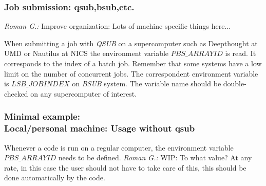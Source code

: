 \documentclass{emulateapj}
\newcommand{\rg}[1]{\color{blue}\textit{Roman G.:} #1\color{black}}
\begin{document}
\subsubsection{Job submission: qsub,bsub,etc.}
\rg{Improve organization: Lots of machine specific things here...}

When submitting a job with \textit{QSUB} on a supercomputer such as
Deepthought at UMD or Nautilus at NICS the environment variable
$PBS\_ARRAYID$ is read. It corresponds to the index of a batch job.
Remember that some systems have a low limit on the number of
concurrent jobs.  The correspondent environment variable is
$LSB\_JOBINDEX$ on \textit{BSUB} system. The variable name should be
double-checked on any supercomputer of interest.  

\subsubsection{{\bf Minimal example}: \\
  Local/personal machine: Usage without qsub}

Whenever a code is run on a regular computer, the environment variable
$PBS\_ARRAYID$ needs to be defined. \rg{WIP: To what value? At any
  rate, in this case the user should not have to take care of this,
  this should be done automatically by the code.}
\end{document}

